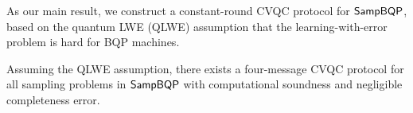 

As our main result, we construct a constant-round CVQC protocol for $\operatorname{\mathsf{SampBQP}}$, based on the quantum LWE (QLWE) assumption that the learning-with-error problem is hard for BQP machines. 
\begin{theorem}[informal] \label{thm:qpip0-informal}
Assuming the QLWE assumption, there exists a four-message CVQC protocol for all sampling problems in $\operatorname{\mathsf{SampBQP}}$ with computational soundness and negligible completeness error.
\end{theorem}













